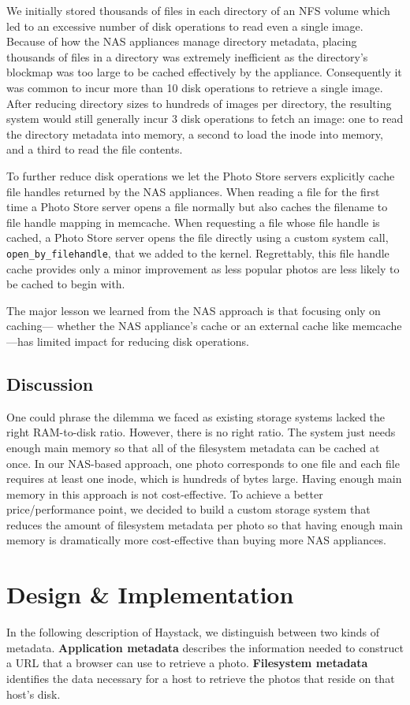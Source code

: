 \documentclass[11pt]{article}
\begin{document}
We initially stored thousands of files in each directory of an NFS volume which led to an excessive
number of disk operations to read even a single image. Because of how the NAS appliances manage
directory metadata, placing thousands of files in a directory was extremely inefficient as the
directory’s blockmap was too large to be cached effectively by the appliance. Consequently it was
common to incur more than 10 disk operations to retrieve a single image. After reducing directory
sizes to hundreds of images per directory, the resulting system would still generally incur 3 disk
operations to fetch an image: one to read the directory metadata into memory, a second to load the
inode into memory, and a third to read the file contents.

To further reduce disk operations we let the Photo Store servers explicitly cache file handles
returned by the NAS appliances. When reading a file for the first time a Photo Store server opens a
file normally but also caches the filename to file handle mapping in memcache. When requesting a file
whose file handle is cached, a Photo Store server opens the file directly using a custom system call,
\texttt{open\_by\_filehandle}, that we added to the kernel. Regrettably, this file handle cache provides only a
minor improvement as less popular photos are less likely to be cached to begin with.

The major lesson we learned from the NAS approach is that focusing only on caching— whether the NAS
appliance’s cache or an external cache like memcache—has limited impact for reducing disk operations.
\subsection{Discussion}
\label{sec:org41563e3}
One could phrase the dilemma we faced as existing storage systems lacked the right RAM-to-disk ratio.
However, there is no right ratio. The system just needs enough main memory so that all of the
filesystem metadata can be cached at once. In our NAS-based approach, one photo corresponds to one
file and each file requires at least one inode, which is hundreds of bytes large. Having enough main
memory in this approach is not cost-effective. To achieve a better price/performance point, we decided
to build a custom storage system that reduces the amount of filesystem metadata per photo so that
having enough main memory is dramatically more cost-effective than buying more NAS appliances.
\section{Design \& Implementation}
\label{sec:org014ffee}
In the following description of Haystack, we distinguish between two kinds of metadata. \textbf{Application
metadata} describes the information needed to construct a URL that a browser can use to retrieve a
photo. \textbf{Filesystem metadata} identifies the data necessary for a host to retrieve the photos that reside
on that host’s disk.
\end{document}
